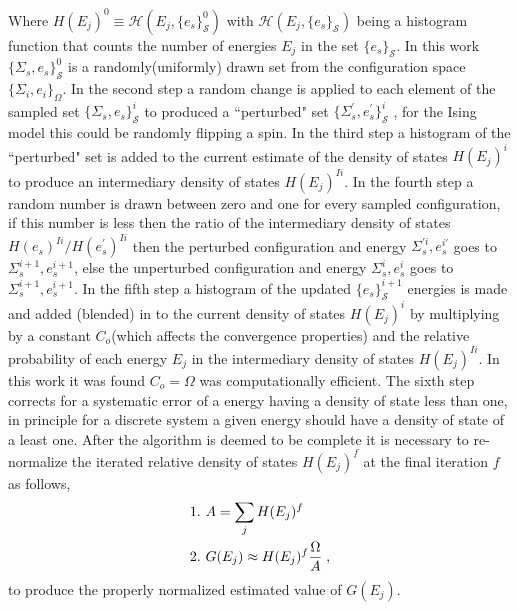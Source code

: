 \documentclass[aps,prl,reprint,superscriptaddress,showkeys]{revtex4-1}
\begin{document}
Where  $H(E_j)^0 \equiv \mathcal{H}(E_j,\{e_s\}_{\mathcal{S}}^0)$ with $\mathcal{H}(E_j,\{e_s\}_{\mathcal{S}})$ being a histogram function that counts the number of energies $E_j$ in the set $\{e_s\}_{\mathcal{S}}$. In this work $\{\Sigma_{s},e_s\}_{\mathcal{S}}^0$  is a randomly(uniformly) drawn set from the configuration space $\{ \Sigma_i, e_i \}_\Omega $. In the second step  a random change is applied to each element of the sampled set $\{\Sigma_{s},e_s\}_{\mathcal{S}}^i$ to produced a ``perturbed" set $ \{\Sigma_{s}^{'},e_s^{'}\}_{\mathcal{S}}^i$ , for the Ising model this could be randomly flipping a spin. In the third step a histogram of the ``perturbed" set is added to the current estimate of the density of states $H(E_j)^i$ to produce an intermediary density of states $H(E_j)^{Ii}$. In the fourth step a random number is drawn between zero and one for every sampled configuration, if this number is less then the ratio of the intermediary density of states $H(e_s)^{Ii}/H(e_s^{'})^{Ii}$ then the perturbed configuration and energy  $\Sigma_{s}^{'i},e_s^{i'}$  goes to $\Sigma_{s}^{i+1},e_s^{i+1}$,  else the unperturbed configuration and energy $\Sigma_{s}^{i},e_s^i$  goes to $\Sigma_{s}^{i+1},e_s^{i+1}$. In the fifth step a histogram of the updated $\{ e_s \}^{i+1}_{\mathcal{S}}$ energies is made and added (blended) in to the current density of states $H(E_j)^i$   by multiplying  by a constant $C_{o}$(which affects the convergence properties) and the relative probability of each energy $E_j$ in the  intermediary density of states $H(E_j)^{Ii}$. In this work it was found  $C_{o}=\Omega$ was computationally efficient. The sixth step corrects for a systematic error of a energy having a density of state less than one, in principle for a discrete system a given energy should have a density of state of a least one.  After the algorithm is deemed to be complete it is necessary to re-normalize the iterated relative density of states $H(E_j)^f$ at the final iteration $f$ as follows, 
\begin{equation}
\begin{split}
&1. \hspace{0.125cm} A = \sum_jH(E_j)^f\\
&2. \hspace{0.125cm} G(E_j)\approx H(E_j)^f \frac{\Omega}{A} \;,
\end{split}
\end{equation}
to produce the properly normalized estimated value of $G(E_j)$. 
\end{document}
